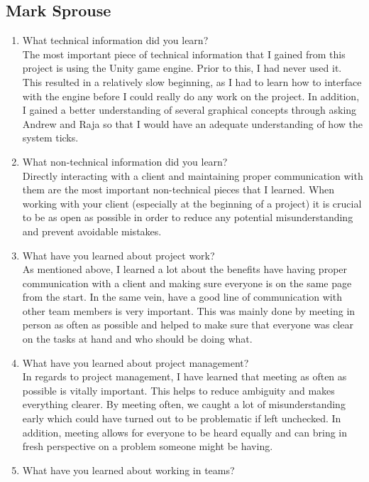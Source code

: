 \documentclass[onecolumn, draftclsnofoot,10pt, compsoc]{IEEEtran}
\def \GroupMemberThree{			Mark Sprouse			}
\begin{document}
\subsection{\GroupMemberThree}
\begin{enumerate}
\item What technical information did you learn?\\
	The most important piece of technical information that I gained from this project is using the Unity game engine.
    Prior to this, I had never used it.
    This resulted in a relatively slow beginning, as I had to learn how to interface with the engine before I could really do any work on the project.
    In addition, I gained a better understanding of several graphical concepts through asking Andrew and Raja so that I would have an adequate understanding of how the system ticks.
\item What non-technical information did you learn?\\
	Directly interacting with a client and maintaining proper communication with them are the most important non-technical pieces that I learned.
    When working with your client (especially at the beginning of a project) it is crucial to be as open as possible in order to reduce any potential misunderstanding and prevent avoidable mistakes.
\item What have you learned about project work?\\
	As mentioned above, I learned a lot about the benefits have having proper communication with a client and making sure everyone is on the same page from the start.
    In the same vein, have a good line of communication with other team members is very important.
    This was mainly done by meeting in person as often as possible and helped to make sure that everyone was clear on the tasks at hand and who should be doing what.
\item What have you learned about project management?\\
	In regards to project management, I have learned that meeting as often as possible is vitally important.
    This helps to reduce ambiguity and makes everything clearer.
    By meeting often, we caught a lot of misunderstanding early which could have turned out to be problematic if left unchecked.
    In addition, meeting allows for everyone to be heard equally and can bring in fresh perspective on a problem someone might be having.
\item What have you learned about working in teams?\\

\end{enumerate}
\end{document}
